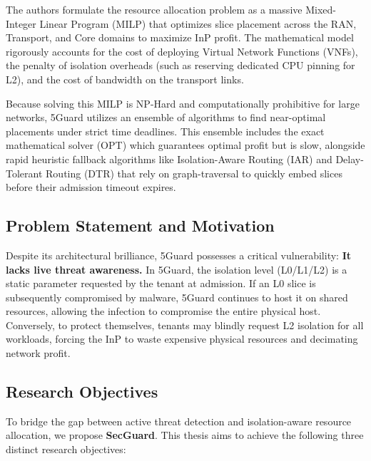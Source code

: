 \documentclass[12pt]{article}
\begin{document}
The authors formulate the resource allocation problem as a massive Mixed-Integer Linear Program (MILP) that optimizes slice placement across the RAN, Transport, and Core domains to maximize InP profit. The mathematical model rigorously accounts for the cost of deploying Virtual Network Functions (VNFs), the penalty of isolation overheads (such as reserving dedicated CPU pinning for L2), and the cost of bandwidth on the transport links. 

Because solving this MILP is NP-Hard and computationally prohibitive for large networks, 5Guard utilizes an ensemble of algorithms to find near-optimal placements under strict time deadlines. This ensemble includes the exact mathematical solver (OPT) which guarantees optimal profit but is slow, alongside rapid heuristic fallback algorithms like Isolation-Aware Routing (IAR) and Delay-Tolerant Routing (DTR) that rely on graph-traversal to quickly embed slices before their admission timeout expires.

\subsection{Problem Statement and Motivation}
Despite its architectural brilliance, 5Guard possesses a critical vulnerability: \textbf{It lacks live threat awareness.} In 5Guard, the isolation level (L0/L1/L2) is a static parameter requested by the tenant at admission. If an L0 slice is subsequently compromised by malware, 5Guard continues to host it on shared resources, allowing the infection to compromise the entire physical host. Conversely, to protect themselves, tenants may blindly request L2 isolation for all workloads, forcing the InP to waste expensive physical resources and decimating network profit.

\subsection{Research Objectives}
To bridge the gap between active threat detection and isolation-aware resource allocation, we propose \textbf{SecGuard}. This thesis aims to achieve the following three distinct research objectives:
\end{document}
